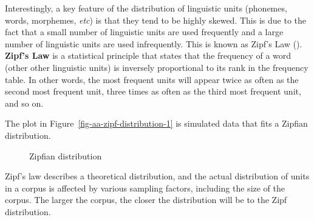 \documentclass[
  letterpaper,
  DIV=11,
  numbers=noendperiod]{scrreprt}
\theoremstyle{definition}
\theoremstyle{remark}
\begin{document}
Interestingly, a key feature of the distribution of linguistic units
(phonemes, words, morphemes, \emph{etc}) is that they tend to be highly
skewed. This is due to the fact that a small number of linguistic units
are used frequently and a large number of linguistic units are used
infrequently. This is known as Zipf's Law (). \textbf{Zipf's Law} is a statistical principle that states that
the frequency of a word (other other linguistic units) is inversely
proportional to its rank in the frequency table. In other words, the
most frequent units will appear twice as often as the second most
frequent unit, three times as often as the third most frequent unit, and
so on.

The plot in Figure~\ref{fig-aa-zipf-distribution-1} is simulated data
that fits a Zipfian distribution.

\begin{figure}[H]

\begin{minipage}{0.50\linewidth}



\end{minipage}%
%
\begin{minipage}{0.50\linewidth}



\end{minipage}%

\caption{\label{fig-aa-zipf-distribution}Zipfian distribution}

\end{figure}%

Zipf's law describes a theoretical distribution, and the actual
distribution of units in a corpus is affected by various sampling
factors, including the size of the corpus. The larger the corpus, the
closer the distribution will be to the Zipf distribution.
\end{document}
